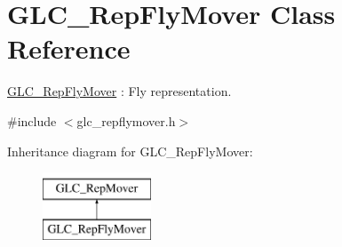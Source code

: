 \hypertarget{class_g_l_c___rep_fly_mover}{\section{G\-L\-C\-\_\-\-Rep\-Fly\-Mover Class Reference}
\label{class_g_l_c___rep_fly_mover}
}


\hyperlink{class_g_l_c___rep_fly_mover}{G\-L\-C\-\_\-\-Rep\-Fly\-Mover} \-: Fly representation.  




{\ttfamily \#include $<$glc\-\_\-repflymover.\-h$>$}

Inheritance diagram for G\-L\-C\-\_\-\-Rep\-Fly\-Mover\-:\begin{figure}[H]
\begin{center}
\leavevmode
\includegraphics[height=2.000000cm]{class_g_l_c___rep_fly_mover}
\end{center}
\end{figure}
